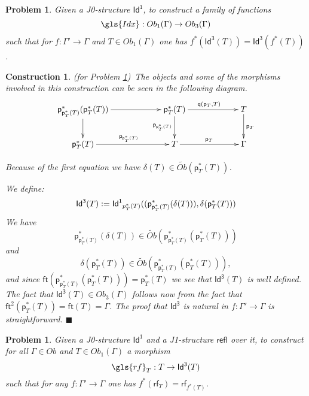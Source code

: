 \documentclass[12pt]{article}
\numberwithin{equation}{section}
\newenvironment{eq}{\begin{equation}}{\end{equation}}
\newtheorem{problem}[proposition]{Problem}
\newtheorem{construction0}[proposition]{Construction}
\newenvironment{construction}[1]{\begin{construction0}(for Problem \ref{#1})\ }{$\blacksquare$ \end{construction0}}
\newcommand{\llabel}[1]{\label{#1}}
\newcommand{\sr}{\rightarrow}
\newcommand{\wt}{\widetilde}
\newcommand{\ft}{\mathsf{ft}}
\newcommand{\p}{\mathsf{p}}
\newcommand{\q}{\mathsf{q}}
\newcommand{\Id}{\mathsf{Id^1}} %
\newcommand{\Idx}{\mathsf{Id^3}} %
\newcommand{\refl}{\mathsf{refl}}
\newcommand{\rf}{\mathsf{rf}}
\begin{document}
%
\begin{problem}
\llabel{2015.03.27.prob1} Given a J0-structure $\Id$, to construct a family of
functions
%
$$\gls{Idx}:Ob_1(\Gamma)\sr Ob_3(\Gamma)$$
%
such that for $f:\Gamma'\sr \Gamma$ and $T\in Ob_1(\Gamma)$ one has
$f^*(\Idx(T))=\Idx(f^*(T))$.
\end{problem}
%
\begin{construction}{2015.03.27.prob1}\llabel{2015.03.27.constr1}\rm
The objects and some of the morphisms involved
in this construction can be seen in the following diagram.
%
$$
\begin{xy}
          \xymatrix@C=5pc{ \p_{\p_T^*(T)}^*(\p_T^*(T)) \ar[r] \ar[d]& \p_T^*(T)
            \ar[r]^{\q(\p_T,T)} \ar[d]_{\p_{\p_T^*(T)}} & T \ar[d]^{\p_T}\\ \p_T^*(T)
            \ar[r]^{\p_{\p_T^*(T)}} & T \ar[r]^{\p_T} & \Gamma }
\end{xy}
$$

Because of the first equation we have $\delta(T)\in \wt{Ob}(\p_T^*(T))$.

We define:
%
\begin{eq}
\llabel{2015.04.06.eq1}
\Idx(T):=\Id_{\\p_T^*(T)}((\p_{\p_T^*(T)}^*(\delta(T))), \delta(\p_T^*(T)))
\end{eq}%
%
We have
%
$$\p_{\p_T^*(T)}^*(\delta(T))\in \wt{Ob}(\p_{\p_T^*(T)}^*(\p_T^*(T)))$$
%
and
%
$$\delta(\p_T^*(T))\in \wt{Ob}(\p_{\p_T^*(T)}^*(\p_T^*(T))),$$
%
and since $\ft(\p_{\p_T^*(T)}^*(\p_T^*(T)))=\p_T^*(T)$ we see that $\Idx(T)$ is well
defined. The fact that $\Idx(T)\in Ob_3(\Gamma)$ follows now from the fact that
$\ft^2(\p_T^*(T))=\ft(T)=\Gamma$.
The proof that $\Idx$ is natural in $f:\Gamma'\sr \Gamma$ is straightforward.
\end{construction}
%
%
\begin{problem}
\llabel{2015.03.27.prob2} Given a J0-structure $\Id$ and a J1-structure $\refl$
over it, to construct for all $\Gamma\in Ob$ and $T\in Ob_1(\Gamma)$ a morphism
%
$$\gls{rf}_T:T\sr \Idx(T)$$
%
such that for any $f:\Gamma'\sr \Gamma$ one has $f^*(\rf_T)=\rf_{f^*(T)}$.
\end{problem}
%
\end{document}
